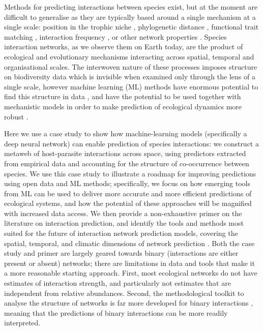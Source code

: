 Methods for predicting interactions between species exist, but at the
moment are difficult to generalise as they are typically based around a
single mechanism at a single scale: position in the trophic niche
\cite{Gravel2013InfFoo, Petchey2008SizFor}, phylogenetic distance
\cite{Pomeranz2018InfPre, Elmasri2020HieBay}, functional trait matching
\cite{Bartomeus2016ComFra}, interaction frequency
\cite{Weinstein2017ComTra, Vazquez2005IntFre}, or other network
properties \cite{Terry2020FinMis, Stock2017LinFil}. Species interaction
networks, as we observe them on Earth today, are the product of
ecological and evolutionary mechanisms interacting across spatial,
temporal and organisational scales. The interwoven nature of these
processes imposes structure on biodiversity data which is invisible when
examined only through the lens of a single scale, however machine
learning (ML) methods have enormous potential to find this structure in
data \cite{Desjardins-Proulx2019ArtInt}, and have the potential to be
used together with mechanistic models in order to make prediction of
ecological dynamics more robust \cite{Rackauckas2020UniDif}.

Here we use a case study to show how machine-learning models
(specifically a deep neural network) can enable prediction of species
interactions: we construct a metaweb of host-parasite interactions
across space, using predictors extracted from empirical data and
accounting for the structure of co-occurrence between species. We use
this case study to illustrate a roadmap for improving predictions using
open data and ML methods; specifically, we focus on how emerging tools
from ML can be used to deliver more accurate and more efficient
predictions of ecological systems, and how the potential of these
approaches will be magnified with increased data access. We then provide
a non-exhaustive primer on the literature on interaction prediction, and
identify the tools and methods most suited for the future of interaction
network prediction models, covering the spatial, temporal, and climatic
dimensions of network prediction \cite{Burkle2011FutPla}. Both the case
study and primer are largely geared towards binary (interactions are
either present or absent) networks; there are limitations in data and
tools that make it a more reasonable starting approach. First, most
ecological networks do not have estimates of interaction strength, and
particularly not estimates that are independent from relative
abundances. Second, the methodological toolkit to analyse the structure
of networks is far more developed for binary interactions
\cite{Delmas2018AnaEco}, meaning that the predictions of binary
interactions can be more readily interpreted.

